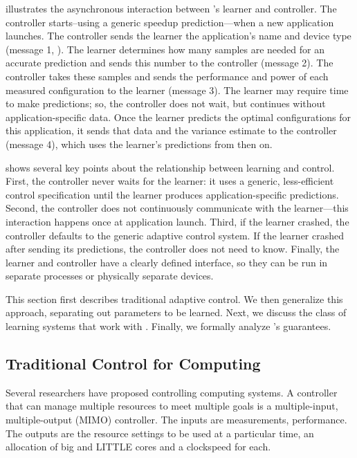  illustrates the asynchronous interaction between
\SYSTEM{}'s learner and controller. The controller starts--using a
generic speedup prediction---when a new application launches.  The
controller sends the learner the application's name and device type
(message 1, ).  The learner determines how many
samples are needed for an accurate prediction and sends this number to
the controller (message 2).  The controller takes these samples and
sends the performance and power of each measured configuration to the
learner (message 3).  The learner may require time to make
predictions; so, the controller does not wait, but continues without
application-specific data.  Once the learner predicts the optimal
configurations for this application, it sends that data and the
variance estimate to the controller (message 4), which uses the
learner's predictions from then on.

 shows several key points about the relationship
between learning and control.  First, the controller never waits for
the learner: it uses a generic, less-efficient control specification
until the learner produces application-specific predictions.  Second,
the controller does not continuously communicate with the
learner---this interaction happens once at application launch.  Third,
if the learner crashed, the controller defaults to the generic
adaptive control system.  If the learner crashed after sending its
predictions, the controller does not need to know.  Finally, the
learner and controller have a clearly defined interface, so they can
be run in separate processes or physically separate devices.

This section first describes traditional adaptive control.  We then
generalize this approach, separating out parameters to be learned.
Next, we discuss the class of learning systems that work with
\SYSTEM{}.  Finally, we formally analyze \SYSTEM{}'s guarantees.


\subsection{Traditional Control for Computing}
Several researchers have proposed controlling computing systems.  A
controller that can manage multiple resources to meet multiple goals
is a multiple-input, multiple-output (MIMO) controller.  The inputs
are measurements, \eg{} performance.  The outputs are the resource
settings to be used at a particular time, \eg{} an allocation of big
and LITTLE cores and a clockspeed for each.

